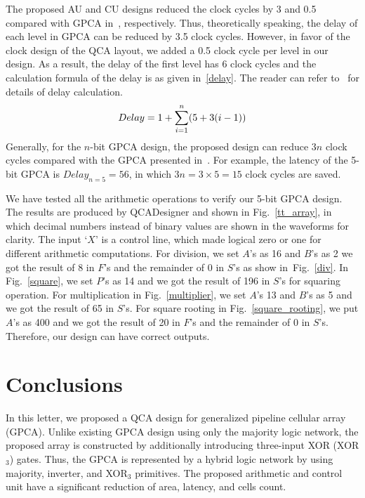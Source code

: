 \documentclass[9pt,journal,compsoc]{IEEEtran}
\begin{document}
The proposed AU and CU designs reduced the clock cycles by 3 and 0.5 compared with GPCA in~\cite{2}, respectively. Thus, theoretically speaking, the delay of each level in GPCA can be reduced by 3.5 clock cycles. However, in favor of the clock design of the QCA layout, we added a 0.5 clock cycle per level in our design. 
As a result, the delay of the first level has 6 clock cycles and the calculation formula of the delay is as given in~\eqref{delay}. The reader can refer to~\cite{2} for details of delay calculation.
\begin{equation}\label{delay}\vspace{-1ex}
\begin{split}\vspace{-1ex}
& Delay =1 + \sum\limits_{i=1}^{n}(5  + 3(i-1))\\
\end{split}\vspace{-1ex}
\end{equation}
Generally, for the $n$-bit GPCA design, the proposed design can reduce $3n$ clock cycles compared with the GPCA presented in~\cite{2}.
For example, the latency of the 5-bit GPCA is $Delay_{n=5}=56$, in which $3n=3 \times 5=15$ clock cycles are saved. 

We have tested all the arithmetic operations to verify our 5-bit GPCA design. 
The results are produced by QCADesigner and shown in Fig.~\ref{tt_array}, in which decimal numbers instead of binary values are shown in the waveforms for clarity. 
The input `$X$' is a control line, which made logical zero or one for different arithmetic computations.
For division, we set $A$'s as 16 and $B$'s as 2 we got the result of 8 in $F$'s and the remainder of 0 in $S$'s as show in~Fig.~\ref{div}. In Fig.~\ref{square}, we set $P$'s as 14 and we got the result of 196 in $S$'s for squaring operation. For multiplication in Fig.~\ref{multiplier}, we set $A$'s 13 and $B$'s as 5 and we got the result of 65 in $S$'s. For square rooting in Fig.~\ref{square_rooting}, we put $A$'s as 400 and we got the result of 20 in $F$'s and the remainder of $0$ in $S$'s.
Therefore, our design can have correct outputs.


\vspace{-2ex}
\section{Conclusions}
In this letter, we proposed a QCA design for generalized pipeline cellular array (GPCA). 
Unlike existing GPCA design using only the majority logic network, the proposed array is constructed by additionally introducing three-input XOR (XOR$_3$) gates. Thus, the GPCA is represented by a hybrid logic network by using majority, inverter, and XOR$_3$ primitives. The proposed arithmetic and control unit have a significant reduction of area, latency, and cells count. 
\end{document}
